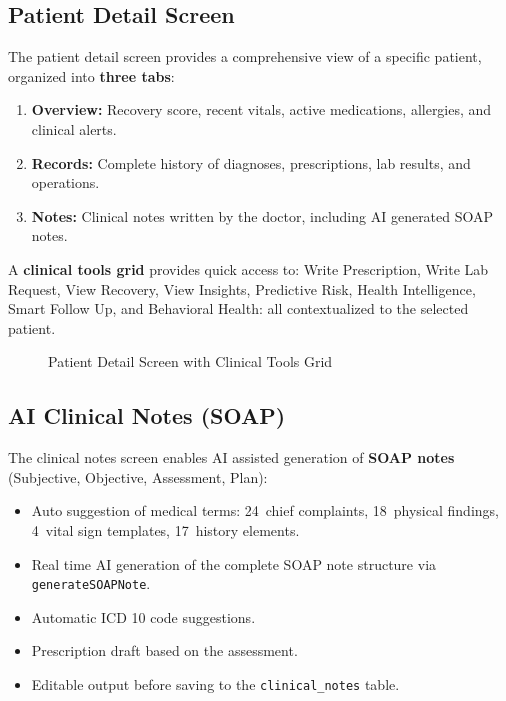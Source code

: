 \documentclass[12pt,a4paper,oneside]{report}
\begin{document}
\subsection{Patient Detail Screen}

The patient detail screen provides a comprehensive view of a specific patient, organized into \textbf{three tabs}:

\begin{enumerate}
    \item \textbf{Overview:} Recovery score, recent vitals, active medications, allergies, and clinical alerts.
    \item \textbf{Records:} Complete history of diagnoses, prescriptions, lab results, and operations.
    \item \textbf{Notes:} Clinical notes written by the doctor, including AI generated SOAP notes.
\end{enumerate}

A \textbf{clinical tools grid} provides quick access to: Write Prescription, Write Lab Request, View Recovery, View Insights, Predictive Risk, Health Intelligence, Smart Follow Up, and Behavioral Health: all contextualized to the selected patient.

\begin{figure}[H]
    \centering
    \caption{Patient Detail Screen with Clinical Tools Grid}
    \label{fig:screen patient detail}
\end{figure}

\subsection{AI Clinical Notes (SOAP)}

The clinical notes screen enables AI assisted generation of \textbf{SOAP notes} (Subjective, Objective, Assessment, Plan):

\begin{itemize}
    \item Auto suggestion of medical terms: 24~chief complaints, 18~physical findings, 4~vital sign templates, 17~history elements.
    \item Real time AI generation of the complete SOAP note structure via \texttt{generateSOAPNote}.
    \item Automatic ICD 10 code suggestions.
    \item Prescription draft based on the assessment.
    \item Editable output before saving to the \texttt{clinical\_notes} table.
\end{itemize}
\end{document}
